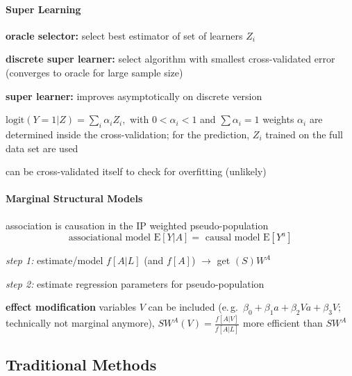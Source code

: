 \documentclass[8pt,twoside]{extarticle}
\begin{document}
\begin{multicols}{2}
\paragraph{Super Learning} \citep{van2007super, van2011targeted}

 \textbf{oracle selector:} select best estimator of set of learners $Z_i$

 \textbf{discrete super learner:} select algorithm with smallest cross-validated error (converges to oracle for large sample size)

 \textbf{super learner:} improves asymptotically on discrete version

$\mathrm{logit} (Y=1|Z) = \sum_i \alpha_i Z_i, $ with $0<\alpha_i<1$ and $\sum\alpha_i=1$
weights $\alpha_i$ are determined inside the cross-validation; for the prediction, $Z_i$ trained on the full data set are used

   can be cross-validated itself to check for overfitting (unlikely)


\paragraph{Marginal Structural Models} association is causation in the IP weighted pseudo-population 
$$\text{associational model } \mathrm{E}\left[Y|A\right] = \text{ causal model } \mathrm{E}\left[Y^a\right]$$

 \textit{step 1:} estimate/model $f\left[A|L\right]$ (and $f\left[A\right]$) $\rightarrow$ get $(S)W^A$

 \textit{step 2:} estimate regression parameters for pseudo-population

 \textbf{effect modification} variables $V$ can be included (e.\,g.\ $\beta_0+\beta_1 a+\beta_2 V a + \beta_3 V$; technically not marginal anymore), $SW^A(V) = \frac{f\left[A|V\right]}{f\left[A|L\right]}$ more efficient than $SW^A$
 










\end{multicols}

\subsection{Traditional Methods}
\end{document}
